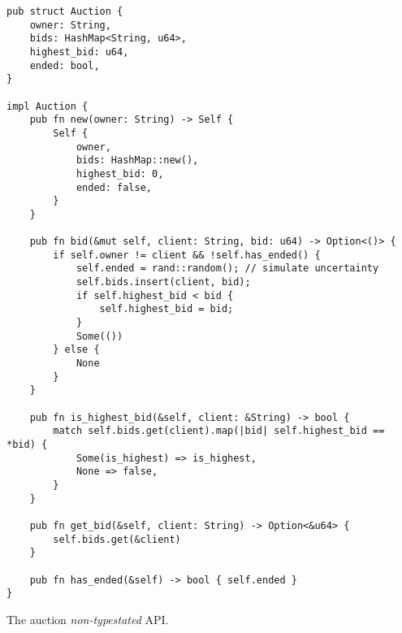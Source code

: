 \begin{listing}
    \begin{verbatim}
pub struct Auction {
    owner: String,
    bids: HashMap<String, u64>,
    highest_bid: u64,
    ended: bool,
}

impl Auction {
    pub fn new(owner: String) -> Self {
        Self {
            owner,
            bids: HashMap::new(),
            highest_bid: 0,
            ended: false,
        }
    }

    pub fn bid(&mut self, client: String, bid: u64) -> Option<()> {
        if self.owner != client && !self.has_ended() {
            self.ended = rand::random(); // simulate uncertainty
            self.bids.insert(client, bid);
            if self.highest_bid < bid {
                self.highest_bid = bid;
            }
            Some(())
        } else {
            None
        }
    }

    pub fn is_highest_bid(&self, client: &String) -> bool {
        match self.bids.get(client).map(|bid| self.highest_bid == *bid) {
            Some(is_highest) => is_highest,
            None => false,
        }
    }

    pub fn get_bid(&self, client: String) -> Option<&u64> {
        self.bids.get(&client)
    }

    pub fn has_ended(&self) -> bool { self.ended }
}
    \end{verbatim}
    \caption{The auction \emph{non-typestated} API.}
    \label{lst:typestate-auction}
\end{listing}

